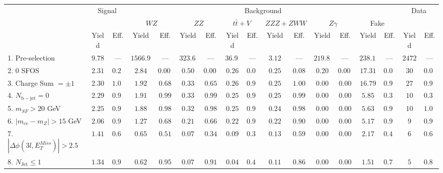 \begin{tabular}{l||c|c||c|c||c|c||c|c||c|c||c|c||c|c||c|c}
\hline
 &                 \multicolumn{2}{c||}{Signal}            &  \multicolumn{12}{c||}{Background} &  \multicolumn{2}{c}{Data} \\
 & &  & \multicolumn{2}{c||}{$WZ$} & \multicolumn{2}{c||}{$ZZ$} & \multicolumn{2}{c||}{$t\bar{t}+V$} & \multicolumn{2}{c||}{$ZZZ+ZWW$} & \multicolumn{2}{c||}{$Z\gamma$} & \multicolumn{2}{c||}{Fake} &  & \\ 
 & Yield & Eff. & Yield & Eff. & Yield & Eff. & Yield & Eff. & Yield & Eff. & Yield & Eff. & Yield & Eff. & Yield & Eff.\\
\hline\hline
1. Pre-selection &  $9.78$ & --- &  $1566.91$ & --- &  $323.60$ &  --- &  $36.93$ &  --- &  $3.12$ & --- &  $219.80$ &  --- &  $238.12$ &  --- & $2472$ &  --- \\ 
\hline
2. 0 SFOS &  $2.31$ &  $0.24$ &  $2.84$ &  $0.002$ &  $0.50$ &  $0.002$ &  $0.26$ &  $0.01$ &  $0.25$ &  $0.08$ &  $0.20$ &  $0.001$ &  $17.31$ &  $0.07$ & $30$ &  $0.01$\\ 
\hline
3. Charge Sum $= \pm 1$ &  $2.30$ &  $1.00$ &  $1.92$ &  $0.68$ &  $0.33$ &  $0.65$ &  $0.26$ &  $0.99$ &  $0.25$ &  $1.00$ &  $0.00$ &  $0.00$ &  $16.79$ &  $0.97$ & $27$ &  $0.90$\\ 
\hline
4. $N_{\mathrm{b-jet}} = 0$ &  $2.29$ &  $0.99$ &  $1.91$ &  $0.99$ &  $0.33$ &  $0.99$ &  $0.25$ &  $0.98$ &  $0.25$ &  $0.99$ &  $0.00$ &  $0.00$ &  $5.85$ &  $0.35$ & $10$ &  $0.37$\\ 
\hline
5. $m_{SF} > 20$ GeV &  $2.25$ &  $0.98$ &  $1.88$ &  $0.98$ &  $0.32$ &  $0.98$ &  $0.25$ &  $0.98$ &  $0.24$ &  $0.98$ &  $0.00$ &  $0.00$ &  $5.63$ &  $0.96$ & $10$ &  $1.00$\\ 
\hline
6. $|m_{ee} - m_{Z}| > 15$ GeV &  $2.06$ &  $0.91$ &  $1.27$ &  $0.68$ &  $0.21$ &  $0.66$ &  $0.22$ &  $0.90$ &  $0.22$ &  $0.90$ &  $0.00$ &  $0.00$ &  $5.17$ &  $0.92$ & $9$ &  $0.90$\\ 
\hline
7. $|\Delta\phi(3l,E_{T}^{Miss})| > 2.5$ &  $1.41$ &  $0.69$ &  $0.65$ &  $0.51$ &  $0.07$ &  $0.34$ &  $0.09$ &  $0.38$ &  $0.13$ &  $0.59$ &  $0.00$ &  $0.00$ &  $2.17$ &  $0.42$ & $6$ &  $0.67$\\ 
\hline
8. $N_{\mathrm{Jet}} \leq 1$ &  $1.34$ &  $0.95$ &  $0.62$ &  $0.95$ &  $0.07$ &  $0.91$ &  $0.04$ &  $0.45$ &  $0.11$ &  $0.86$ &  $0.00$ &  $0.00$ &  $1.51$ &  $0.70$ & $5$ &  $0.83$\\ 
\hline
\end{tabular}



